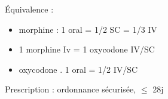 \documentclass[11pt]{article}
\begin{document}
Équivalence :
\begin{itemize}
\item morphine : 1 oral = 1/2 SC = 1/3 IV
\item 1 morphine Iv = 1 oxycodone IV/SC
\item oxycodone . 1 oral = 1/2 IV/SC
\end{itemize}

Prescription : ordonnance sécurisée, \(\le\) 28j
\end{document}
